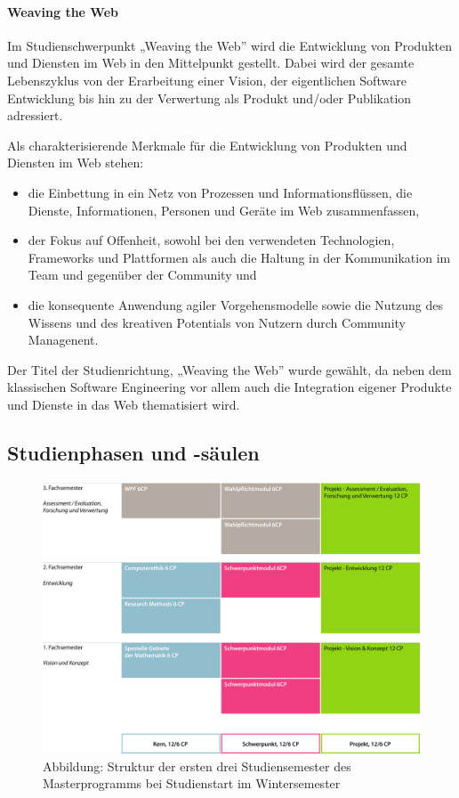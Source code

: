 \paragraph{Weaving the Web}\label{weaving-the-web}

Im Studienschwerpunkt „Weaving the Web'' wird die Entwicklung von
Produkten und Diensten im Web in den Mittelpunkt gestellt. Dabei wird
der gesamte Lebenszyklus von der Erarbeitung einer Vision, der
eigentlichen Software Entwicklung bis hin zu der Verwertung als Produkt
und/oder Publikation adressiert.

Als charakterisierende Merkmale für die Entwicklung von Produkten und
Diensten im Web stehen:

\begin{itemize}
\item
  die Einbettung in ein Netz von Prozessen und Informationsflüssen, die
  Dienste, Informationen, Personen und Geräte im Web zusammenfassen,
\item
  der Fokus auf Offenheit, sowohl bei den verwendeten Technologien,
  Frameworks und Plattformen als auch die Haltung in der Kommunikation
  im Team und gegenüber der Community und
\item
  die konsequente Anwendung agiler Vorgehensmodelle sowie die Nutzung
  des Wissens und des kreativen Potentials von Nutzern durch Community
  Managenent.
\end{itemize}

Der Titel der Studienrichtung, „Weaving the Web'' wurde gewählt, da
neben dem klassischen Software Engineering vor allem auch die
Integration eigener Produkte und Dienste in das Web thematisiert wird.

\subsection{Studienphasen und
-säulen}\label{studienphasen-und--suxe4ulen-1}

\begin{figure}[htbp]
\centering
\includegraphics[width=\columnwidth]{../anhaenge/bilder/ma-struktur.png}
\caption{Abbildung: Struktur der ersten drei Studiensemester des
Masterprogramms bei Studienstart im Wintersemester}
\end{figure}

